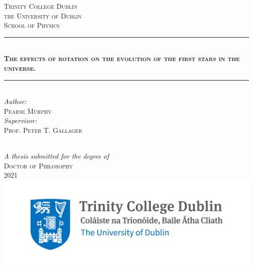 
\begin{titlepage}
\newcommand{\HRule}{\rule{\linewidth}{0.5mm}} %

\center 


\textsc{\Large Trinity College Dublin \\ the University of Dublin}\\[0.5cm] 
\textsc{\large School of Physics}\\[1.0cm] 

\makeatletter
\HRule \\[0.4cm]
\doublespacing
\textsc{ \huge \bfseries The effects of rotation on the evolution of the first stars in the universe.}\\[0.4cm] %
\HRule \\[1cm]
 

\center 
\large
\emph{Author:}\\
\LARGE
\textsc{Pearse Murphy}\\

\center 
\large
\emph{Supervisor:} \\
\textsc{Prof. Peter T. Gallager}



\quad\\[0.5cm]

{\large \emph{A thesis submitted for the degree of}}\\[0.5cm]
\textsc{\Large Doctor of Philosophy}\\[0.5cm]
{\large 2021}\\[1cm] 
\center 
\includegraphics[width=0.75\columnwidth]{tcd_logo.png}
\vfill

\end{titlepage}